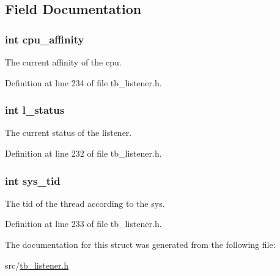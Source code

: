 \subsection{Field Documentation}
\hypertarget{structtb__other__info_ab7a892d2900125821f3d6b11d003191b}{
\subsubsection[{cpu\-\_\-affinity}]{\setlength{\rightskip}{0pt plus 5cm}int cpu\-\_\-affinity}}\label{structtb__other__info_ab7a892d2900125821f3d6b11d003191b}


The current affinity of the cpu. 



Definition at line 234 of file tb\-\_\-listener.\-h.

\hypertarget{structtb__other__info_a35fe7496a6493a097350d748cf5d8908}{
\subsubsection[{l\-\_\-status}]{\setlength{\rightskip}{0pt plus 5cm}int l\-\_\-status}}\label{structtb__other__info_a35fe7496a6493a097350d748cf5d8908}


The current status of the listener. 



Definition at line 232 of file tb\-\_\-listener.\-h.

\hypertarget{structtb__other__info_a053be2f9198a10c7329b11c19dfc6fe4}{
\subsubsection[{sys\-\_\-tid}]{\setlength{\rightskip}{0pt plus 5cm}int sys\-\_\-tid}}\label{structtb__other__info_a053be2f9198a10c7329b11c19dfc6fe4}


The tid of the thread according to the sys. 



Definition at line 233 of file tb\-\_\-listener.\-h.



The documentation for this struct was generated from the following file\-:\begin{DoxyCompactItemize}
\item 
src/\hyperlink{tb__listener_8h}{tb\-\_\-listener.\-h}\end{DoxyCompactItemize}
